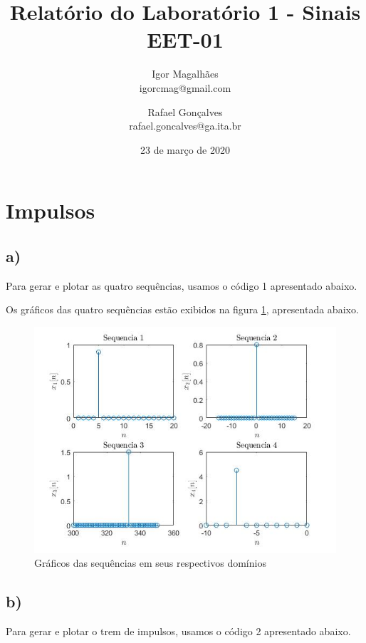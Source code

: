 \documentclass[a4paper, 12pt]{article}
\title{Relatório do Laboratório 1 - Sinais \\ EET-01}
\author{
  Igor Magalhães\\igorcmag@gmail.com
  \and
  Rafael Gonçalves\\rafael.goncalves@ga.ita.br
}
\date{23 de março de 2020}
\begin{document}
\maketitle
\section{Impulsos}

\subsection{a)}

Para gerar e plotar as quatro sequências, usamos o código 1 apresentado abaixo.



Os gráficos das quatro sequências estão exibidos na figura \ref{fig:1a}, apresentada abaixo.

\begin{figure}[H]
	\centering
	\includegraphics[scale=0.7]{../Imagens/ex1/a.jpg} 
	\caption{Gráficos das sequências em seus respectivos domínios}
	\label{fig:1a}
\end{figure}

\subsection{b)}
Para gerar e plotar o trem de impulsos, usamos o código 2 apresentado abaixo.
\end{document}
